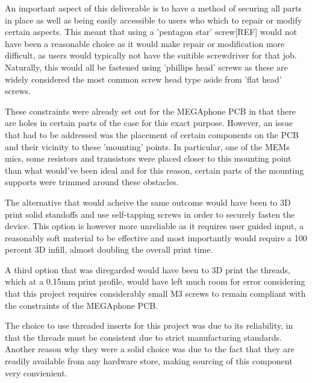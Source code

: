 An important aspect of this deliverable is to have a method of securing all parts in place as well as being easily accessible to users who which to repair or modify certain aspects.
This meant that using a 'pentagon star' screw[REF] would not have been a reasonable choice as it would make repair or modification more difficult, as users would typically not have the suitible screwdriver for that job.
Naturally, this would all be fastened using 'phillips head' screws as these are widely considered the most common screw head type aside from 'flat head' screws.

These constraints were already set out for the MEGAphone PCB in that there are holes in certain parts of the case for this exact purpose.
However, an issue that had to be addressed was the placement of certain components on the PCB and their vicinity to these 'mounting' points.
In particular, one of the MEMs mics, some resistors and transistors were placed closer to this mounting point than what would've been ideal and for this reason, certain parts of the mounting supports were trimmed around these obstacles.

The alternative that would acheive the same outcome would have been to 3D print solid standoffs and use self-tapping screws in order to securely fasten the device.
This option is however more unreliable as it requires user guided input, a reasonably soft material to be effective and most importantly would require a 100 percent 3D infill, almost doubling the overall print time.

A third option that was diregarded would have been to 3D print the threads, which at a 0.15mm print profile, would have left much room for error considering that this project requires considerably small M3 screws to remain compliant with the constraints of the MEGAphone PCB.

The choice to use threaded inserts for this project was due to its reliability, in that the threads must be consistent due to strict manufacturing standards.
Another reason why they were a solid choice was due to the fact that they are readily available from any hardware store, making sourcing of this component very convienient.

